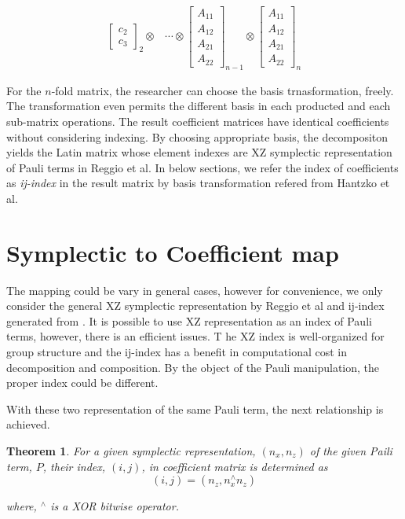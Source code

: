 \documentclass[twocolumn]{article}
\newtheorem{theorem}{Theorem}
\begin{document}
\begin{eqnarray}
\begin{bmatrix}
        c_2\\
        c_3
    \end{bmatrix}_2 \otimes
    &\cdots \otimes
    \begin{bmatrix}
        A_{11} \\
        A_{12} \\
        A_{21} \\
        A_{22}
    \end{bmatrix}_{n-1} \otimes
    \begin{bmatrix}
        A_{11} \\
        A_{12} \\
        A_{21} \\
        A_{22}
    \end{bmatrix}_n\nonumber
\end{eqnarray}

For the $n$-fold matrix, the researcher can choose the basis trnasformation, freely.
The transformation even permits the different basis in each producted and each sub-matrix
operations. The result coefficient matrices have identical coefficients without considering indexing.
By choosing appropriate basis, the decompositon yields the Latin matrix whose element indexes are XZ symplectic representation
of Pauli terms in Reggio et al\cite{reggio_fast_2023}.
In below sections, we refer the index of coefficients as \textit{ij-index} in the result matrix 
by basis transformation refered from Hantzko et al.

\section{Symplectic to Coefficient map}

The mapping could be vary in general cases, however for convenience, we only consider
the general XZ symplectic representation by Reggio et al\cite{reggio_fast_2023} and 
ij-index generated from \cite{hantzko_tensorized_2023}.
It is possible to use XZ representation as an index of Pauli terms, 
however, there is an efficient issues.
T he XZ index is well-organized for group structure and 
the ij-index has a benefit in computational cost in decomposition and composition.
By the object of the Pauli manipulation, the proper index could be different.

With these two representation of the same Pauli term, the next relationship is achieved.

\begin{theorem}
    For a given symplectic representation, $(n_x, n_z)$ of the given Paili term, $P$,
    their index, $(i, j)$, in coefficient matrix is determined as 
    $$(i, j) = (n_z, n_x^\wedge n_z)$$

    where, ${}^\wedge$ is a XOR bitwise operator. 
\end{theorem}
\end{document}
